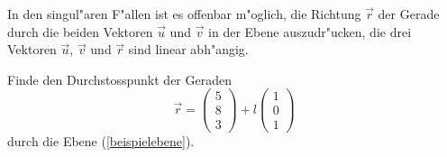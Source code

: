 In den singul"aren F"allen ist es offenbar m"oglich, die Richtung $\vec r$
der Gerade durch die beiden Vektoren $\vec u$ und $\vec v$ in der Ebene
auszudr"ucken, die drei Vektoren $\vec u$, $\vec v$ und $\vec r$ sind
linear abh"angig.

\begin{beispiel}
Finde den Durchstosspunkt der Geraden
\[
\vec r=
\begin{pmatrix} 5\\8\\3 \end{pmatrix}
+
l\begin{pmatrix} 1\\0\\1 \end{pmatrix}
\]
durch die Ebene (\ref{beispielebene}).

\smallskip


\end{beispiel}
